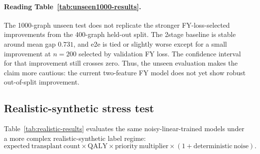 \paragraph{Reading Table~\ref{tab:unseen1000-results}.}
The 1000-graph unseen test does not replicate the stronger FY-loss-selected
improvements from the 400-graph held-out split. The 2stage baseline is stable
around mean gap \(0.731\), and e2e is tied or slightly worse except for a small
improvement at \(n=200\) selected by validation FY loss. The confidence interval
for that improvement still crosses zero. Thus, the unseen evaluation makes the
claim more cautious: the current two-feature FY model does not yet show robust
out-of-split improvement.

\subsection{Realistic-synthetic stress test}

Table~\ref{tab:realistic-results} evaluates the same noisy-linear-trained
models under a more complex realistic-synthetic label regime:
\[
    \mathrm{expected\ transplant\ count}
    \times
    \mathrm{QALY}
    \times
    \mathrm{priority\ multiplier}
    \times
    (1+\mathrm{deterministic\ noise}).
\]

\begin{table}[h]
\centering
\caption{Realistic-synthetic label-regime stress test.}
\label{tab:realistic-results}
\end{table}

